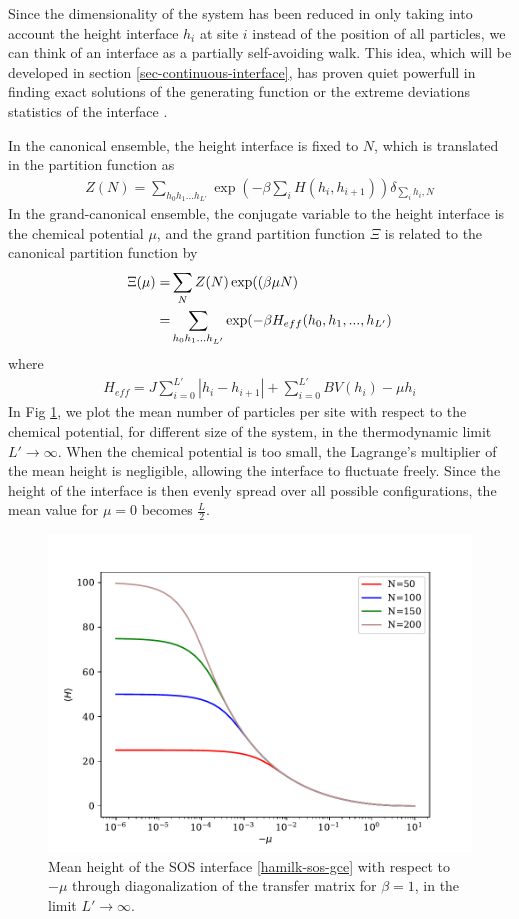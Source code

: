 Since the dimensionality of the system has been reduced in only taking into account the height interface $h_i$ at site $i$ instead of the position of all particles, we can think of an interface as a partially self-avoiding walk. This idea, which will be developed in section \ref{sec-continuous-interface}, has proven quiet powerfull in finding exact solutions of the generating function \cite{owczarek_exact_1993} or the extreme deviations statistics of the interface \cite{majumdar_airy_2005,schehr_universal_2006}.

In the canonical ensemble, the height interface is fixed to $N$, which is translated in the partition function as
\begin{align}
Z(N) = \sum_{h_0 h_1 ... h_{L'}} \exp(- \beta \sum_{i} H(h_i,h_{i+1})) \delta_{\sum_i h_i, N}
\label{hamil-sos-cano}
\end{align}
In the grand-canonical ensemble, the conjugate variable to the height interface is the chemical potential $\mu$, and the grand partition function $\Xi$ is related to the canonical partition function by
\begin{align}
\Xi(\mu) =& \sum_N Z(N) \exp((\beta \mu N) \nonumber \\
=& \sum_{h_0 h_1 ... h_{L'}} \exp(-\beta H_{eff}(h_0,h_1,...,h_{L'})
\label{hamilk-sos-gce}
\end{align}
where
\begin{align}
H_{eff} = J \sum_{i=0}^{L'} |h_i-h_{i+1}|+ \sum_{i=0}^{L'} B V(h_i)-\mu h_i
\end{align}
In Fig \ref{hauteur-mu}, we plot the mean number of particles per site with respect to the chemical potential, for different size of the system, in the thermodynamic limit $L' \to \infty$. When the chemical potential is too small, the Lagrange's multiplier of the mean height is negligible, allowing the interface to fluctuate freely. Since the height of the interface is then evenly spread over all possible configurations, the mean value for $\mu=0$ becomes $\frac{L}{2}$.


\begin{figure}
\centering
\includegraphics[width=0.7\linewidth]{int-dyn/hauteur-tm-sos.pdf}
\caption{Mean height of the SOS interface \eqref{hamilk-sos-gce} with respect to $- \mu$ through diagonalization of the transfer matrix for $\beta=1$, in the limit $L'\to \infty$. }
\label{hauteur-mu}
\end{figure}

